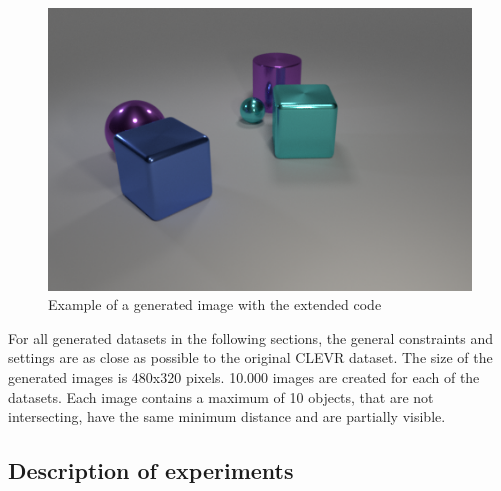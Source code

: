 \begin{figure}[h]
    \centering
    \includegraphics[width=.8\linewidth]{figures/CLEVR_extended_example.png}
    \caption{Example of a generated image with the extended code}
    \label{fig:clevr-extended_example}
\end{figure}

For all generated datasets in the following sections, the general constraints and settings are as close as possible to the original CLEVR dataset. The size of the generated images is 480x320 pixels. 10.000 images are created for each of the datasets. Each image contains a maximum of 10 objects, that are not intersecting, have the same minimum distance and are partially visible.

\subsection{Description of experiments}
